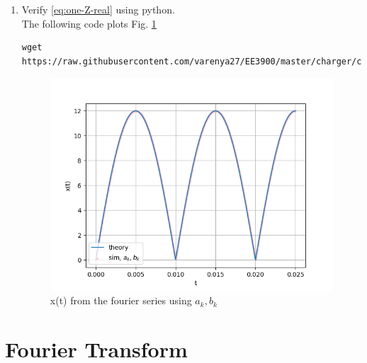 \documentclass[journal,12pt,twocolumn]{IEEEtran}
\renewcommand\thesection{\arabic{section}}
\begin{document}
\begin{enumerate}[label=\thesection.\arabic*,ref=\thesection.\theenumi]
	
\item Verify 
\eqref{eq:one-Z-real}
using python.
\\\solution The following code plots Fig. \ref{fig:xt-sim-ab}
	\begin{lstlisting}
wget https://raw.githubusercontent.com/varenya27/EE3900/master/charger/codes/2_6.py
\end{lstlisting}
	\begin{figure}[h!]
	    \centering
	    \includegraphics[width=\columnwidth]{figures/xt-sim-ab.png}
	    \caption{x(t) from the fourier series using $a_k, b_k$}
	    \label{fig:xt-sim-ab}
	\end{figure}
\end{enumerate}
\section{Fourier Transform}

 
\end{document}
